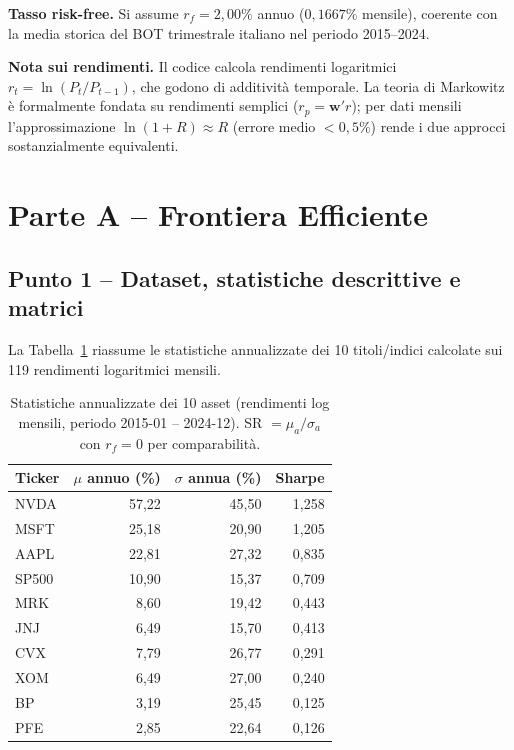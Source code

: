 \documentclass[11pt]{article}
\begin{document}
\textbf{Tasso risk-free.} Si assume $r_f = 2{,}00\%$ annuo ($0{,}1667\%$
mensile), coerente con la media storica del BOT trimestrale italiano
nel periodo 2015--2024.

\textbf{Nota sui rendimenti.} Il codice calcola rendimenti logaritmici
$r_t = \ln(P_t/P_{t-1})$, che godono di additività temporale.
La teoria di Markowitz è formalmente fondata su rendimenti semplici
($r_p = \mathbf{w}'r$); per dati mensili l'approssimazione
$\ln(1+R)\approx R$ (errore medio $<0{,}5\%$) rende i due approcci
sostanzialmente equivalenti.

\section{Parte A -- Frontiera Efficiente}

\subsection{Punto 1 -- Dataset, statistiche descrittive e matrici}

La Tabella~\ref{tab:stats} riassume le statistiche annualizzate
dei 10 titoli/indici calcolate sui 119 rendimenti logaritmici mensili.

\begin{table}[h!]
\centering
\caption{Statistiche annualizzate dei 10 asset (rendimenti log mensili,
periodo 2015-01 -- 2024-12).
SR $= \mu_a / \sigma_a$ con $r_f = 0$ per comparabilità.}
\label{tab:stats}
\begin{tabular}{lrrr}
\toprule
\textbf{Ticker} & \textbf{$\mu$ annuo (\%)} & \textbf{$\sigma$ annua (\%)} & \textbf{Sharpe} \\
\midrule
NVDA  & 57{,}22 & 45{,}50 & 1{,}258 \\
MSFT  & 25{,}18 & 20{,}90 & 1{,}205 \\
AAPL  & 22{,}81 & 27{,}32 & 0{,}835 \\
SP500 & 10{,}90 & 15{,}37 & 0{,}709 \\
MRK   &  8{,}60 & 19{,}42 & 0{,}443 \\
JNJ   &  6{,}49 & 15{,}70 & 0{,}413 \\
CVX   &  7{,}79 & 26{,}77 & 0{,}291 \\
XOM   &  6{,}49 & 27{,}00 & 0{,}240 \\
BP    &  3{,}19 & 25{,}45 & 0{,}125 \\
PFE   &  2{,}85 & 22{,}64 & 0{,}126 \\
\bottomrule
\end{tabular}
\end{table}
\end{document}
